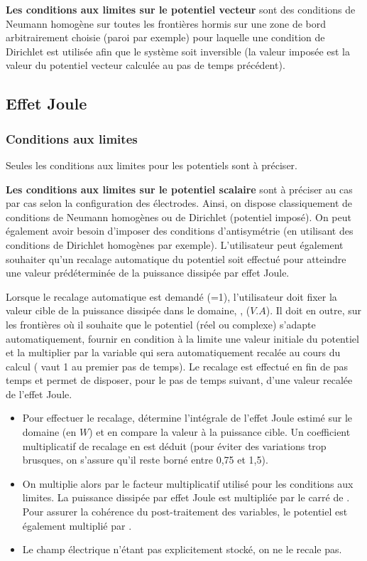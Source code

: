 \bigskip
{\bf Les conditions aux limites sur le potentiel vecteur} sont des conditions de
Neumann homogène sur toutes les frontières hormis sur une zone de bord
arbitrairement choisie (paroi par exemple) pour laquelle une condition de
Dirichlet est utilisée afin que le système soit inversible
(la valeur imposée est la valeur du potentiel vecteur
calculée au pas de temps précédent).



\subsection*{Effet Joule}

\subsubsection*{Conditions aux limites}

Seules les conditions aux limites pour les potentiels sont à préciser.

{\bf Les conditions aux limites sur le potentiel scalaire} sont à préciser
au cas par cas selon la configuration des électrodes. Ainsi, on dispose
classiquement de conditions de Neumann homogènes ou de Dirichlet (potentiel
imposé). On peut également avoir besoin d'imposer des conditions
d'antisymétrie (en utilisant des conditions de Dirichlet homogènes par exemple).
L'utilisateur peut également souhaiter qu'un recalage automatique du potentiel
soit effectué pour atteindre une valeur prédéterminée de la puissance
dissipée par effet Joule.

Lorsque le recalage automatique est demandé (=1), l'utilisateur doit fixer la
valeur cible de la puissance dissipée dans le domaine, , ($V.A$).
Il doit en outre, sur les frontières où il
souhaite que le potentiel (réel ou complexe) s'adapte automatiquement, fournir en
condition à la limite une valeur initiale du potentiel et la multiplier par
la variable  qui sera automatiquement recalée au cours du calcul
( vaut 1 au premier pas de temps).
Le recalage est effectué en fin de pas temps et permet de disposer, pour le pas
de temps suivant, d'une valeur recalée de l'effet
Joule.
\begin{itemize}
\item Pour effectuer le recalage, \CS détermine l'intégrale de l'effet Joule
estimé sur le domaine (en $W$) et en compare la
valeur à la puissance cible. Un coefficient multiplicatif de recalage  en
est déduit (pour éviter des variations trop brusques,
on s'assure qu'il reste borné entre 0,75 et 1,5).
\item On multiplie alors par
 le facteur multiplicatif  utilisé pour les conditions aux
limites. La puissance dissipée par effet
Joule est multipliée par
le carré de . Pour assurer la cohérence du post-traitement des
variables, le potentiel est également
multiplié par .
\item Le champ électrique n'étant pas explicitement
stocké, on ne le recale pas.
\end{itemize}

